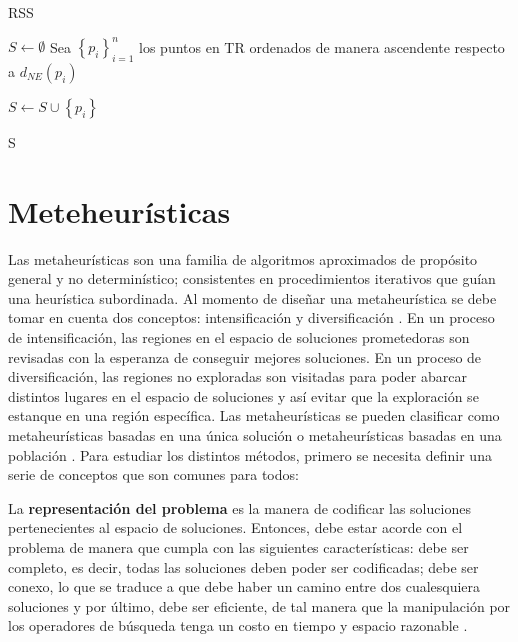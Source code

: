 \begin{algorithm}
\caption{RSS}
\label{rss}
\begin{algorithmic}[1]


\State $S \gets \emptyset$
\State Sea $\left\{p_i\right\}_{i=1}^n$ los puntos en TR ordenados de manera ascendente respecto a $d_{NE}(p_i)$

		\State $S \gets S \cup \left\{p_i\right\}$
	\EndIf
\EndFor

\State \Return S

\end{algorithmic}
\end{algorithm}


\section{Meteheurísticas}


Las metaheurísticas son una familia de algoritmos aproximados de propósito general y no determinístico; consistentes en procedimientos iterativos que guían una heurística subordinada. Al momento de diseñar una metaheurística se debe tomar en cuenta dos conceptos: intensificación y diversificación \cite{talbi2009metaheuristics}. En un proceso de intensificación, las regiones en el espacio de soluciones prometedoras son revisadas con la esperanza de conseguir mejores soluciones. En un proceso de diversificación, las regiones no exploradas son visitadas para poder abarcar distintos lugares en el espacio de soluciones y así evitar que la exploración se estanque en una región específica. Las metaheurísticas se pueden clasificar como metaheurísticas basadas en una única solución o metaheurísticas basadas en una población \cite{talbi2009metaheuristics}. Para estudiar los distintos métodos, primero se necesita definir una serie de conceptos que son comunes para todos:\\

\begin{definicion}
La \textbf{representación del problema} es la manera de codificar las soluciones pertenecientes al espacio de soluciones. Entonces, debe estar acorde con el problema de manera que cumpla con las siguientes características: debe ser completo, es decir, todas las soluciones deben poder ser codificadas; debe ser conexo, lo que se traduce a que debe haber un camino entre dos cualesquiera soluciones y por último, debe ser eficiente, de tal manera que la manipulación por los operadores de búsqueda tenga un costo en tiempo y espacio razonable \cite{talbi2009metaheuristics}.\\
\end{definicion}

